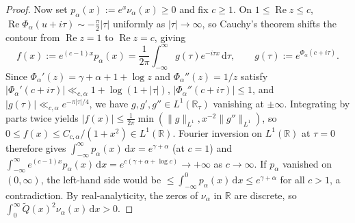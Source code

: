 \documentclass[11pt, reqno]{amsart}
\theoremstyle{remark}
\numberwithin{equation}{section}
\DeclareMathOperator{\re}{Re}
\newcommand{\R}{\mathbb{R}}
\newcommand{\dd}{\,\mathrm{d}}
\begin{document}
\begin{proof}
Now set $p_\alpha(x) := e^x \nu_\alpha(x) \ge 0$ and fix $c \ge 1$. On $1 \le \re z \le c$,
$\re\Phi_\alpha(u+i\tau) \sim -\frac{\pi}{2}|\tau|$ uniformly as $|\tau|\to\infty$, so Cauchy's theorem
shifts the contour from $\re z = 1$ to $\re z = c$, giving
\[
f(x) := e^{(c-1)x} p_\alpha(x) = \frac{1}{2\pi}\int_{-\infty}^\infty g(\tau) e^{-i\tau x}\dd\tau,
\qquad g(\tau) := e^{\Phi_\alpha(c+i\tau)}.
\]
Since $\Phi_\alpha'(z) = \gamma + \alpha + 1 + \log z$ and $\Phi_\alpha''(z) = 1/z$ satisfy
$|\Phi_\alpha'(c+i\tau)| \ll_{c,\alpha} 1 + \log(1+|\tau|)$, $|\Phi_\alpha''(c+i\tau)| \le 1$, and
$|g(\tau)| \ll_{c,\alpha} e^{-\pi|\tau|/4}$, we have $g, g', g'' \in L^1(\R_\tau)$ vanishing at
$\pm\infty$. Integrating by parts twice yields $|f(x)| \le \frac{1}{2\pi}\min(\|g\|_{L^1}, x^{-2}\|g''\|_{L^1})$,
so $0 \le f(x) \le C_{c,\alpha}/(1+x^2) \in L^1(\R)$. Fourier inversion on $L^1(\R)$ at $\tau=0$
therefore gives $\int_{-\infty}^\infty p_\alpha(x)\dd x = e^{\gamma+\alpha}$ (at $c=1$) and
$\int_{-\infty}^\infty e^{(c-1)x} p_\alpha(x)\dd x = e^{c(\gamma+\alpha+\log c)} \to +\infty$ as $c \to \infty$.
If $p_\alpha$ vanished on $(0,\infty)$, the left-hand side would be $\le \int_{-\infty}^0 p_\alpha(x)\dd x \le e^{\gamma+\alpha}$
for all $c > 1$, a contradiction. By real-analyticity, the zeros of $\nu_\alpha$ in $\R$ are discrete,
so $\int_0^\infty \widetilde{Q}(x)^2 \nu_\alpha(x)\dd x > 0$.
\end{proof}
\end{document}
